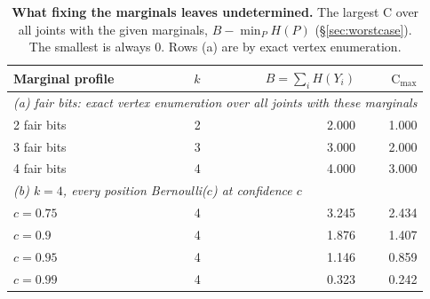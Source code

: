 \begin{table}[!ht]
\centering
\small
\begin{tabular}{lrrr}
\toprule
Marginal profile & $k$ & $B=\sum_i H(Y_i)$ & $\mathrm{C}_{\max}$ \\
\midrule
\multicolumn{4}{l}{\emph{(a) fair bits: exact vertex enumeration over all joints with these marginals}} \\
2 fair bits & 2 & 2.000 & 1.000 \\
3 fair bits & 3 & 3.000 & 2.000 \\
4 fair bits & 4 & 4.000 & 3.000 \\
\midrule
\multicolumn{4}{l}{\emph{(b) $k=4$, every position Bernoulli($c$) at confidence $c$}} \\
$c=0.75$ & 4 & 3.245 & 2.434 \\
$c=0.9$ & 4 & 1.876 & 1.407 \\
$c=0.95$ & 4 & 1.146 & 0.859 \\
$c=0.99$ & 4 & 0.323 & 0.242 \\
\bottomrule
\end{tabular}
\caption{\textbf{What fixing the marginals leaves undetermined.} The largest $\mathrm{C}$ over all joints with the given marginals, $B-\min_P H(P)$ (\S\ref{sec:worstcase}). The smallest is always $0$. Rows (a) are by exact vertex enumeration.}
\label{tab:nontightness}
\end{table}
